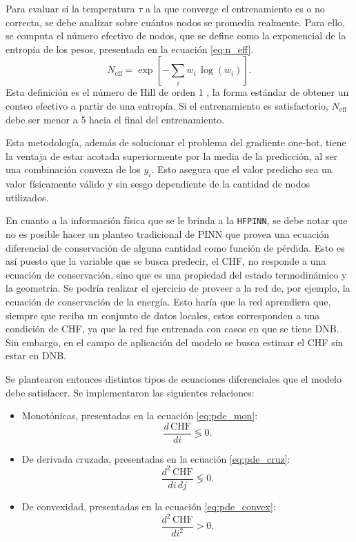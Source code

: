 Para evaluar si la temperatura $\tau$ a la que converge el entrenamiento es o no correcta, se debe analizar sobre cuántos nodos se promedia realmente. Para ello, se computa el número efectivo de nodos, que se define como la exponencial de la entropía de los pesos, presentada en la ecuación \ref{eq:n_eff}.
\begin{equation}
    \label{eq:n_eff}
    N_\mathrm{eff} = \exp\left[ -\sum_i w_i\,\log(w_i) \right].
\end{equation}
Esta definición es el número de Hill de orden 1 \citep{hill1973diversity}, la forma estándar de obtener un conteo efectivo a partir de una entropía. Si el entrenamiento es satisfactorio, $N_\mathrm{eff}$ debe ser menor a 5 hacia el final del entrenamiento.

Esta metodología, además de solucionar el problema del gradiente one-hot, tiene la ventaja de estar acotada superiormente por la media de la predicción, al ser una combinación convexa de los $y_i$. Esto asegura que el valor predicho sea un valor físicamente válido y sin sesgo dependiente de la cantidad de nodos utilizados.

En cuanto a la información física que se le brinda a la \texttt{HFPINN}, se debe notar que no es posible hacer un planteo tradicional de PINN que provea una ecuación diferencial de conservación de alguna cantidad como función de pérdida. Esto es así puesto que la variable que se busca predecir, el CHF, no responde a una ecuación de conservación, sino que es una propiedad del estado termodinámico y la geometría. Se podría realizar el ejercicio de proveer a la red de, por ejemplo, la ecuación de conservación de la energía. Esto haría que la red aprendiera que, siempre que reciba un conjunto de datos locales, estos corresponden a una condición de CHF, ya que la red fue entrenada con casos en que se tiene DNB. Sin embargo, en el campo de aplicación del modelo se busca estimar el CHF sin estar en DNB.

Se plantearon entonces distintos tipos de ecuaciones diferenciales que el modelo debe satisfacer. Se implementaron las siguientes relaciones:
\begin{itemize}
    \item Monotónicas, presentadas en la ecuación \ref{eq:pde_mon}:
    \begin{equation}
        \label{eq:pde_mon}
        \frac{d\,\mathrm{CHF}}{di} \lessgtr 0.
    \end{equation}
    \item De derivada cruzada, presentadas en la ecuación \ref{eq:pde_cruz}:
    \begin{equation}
        \label{eq:pde_cruz}
        \frac{d^2\,\mathrm{CHF}}{di\,dj} \lessgtr 0.
    \end{equation}
    \item De convexidad, presentadas en la ecuación \ref{eq:pde_convex}:
    \begin{equation}
        \label{eq:pde_convex}
        \frac{d^2\,\mathrm{CHF}}{di^2} > 0.
    \end{equation}
\end{itemize}

